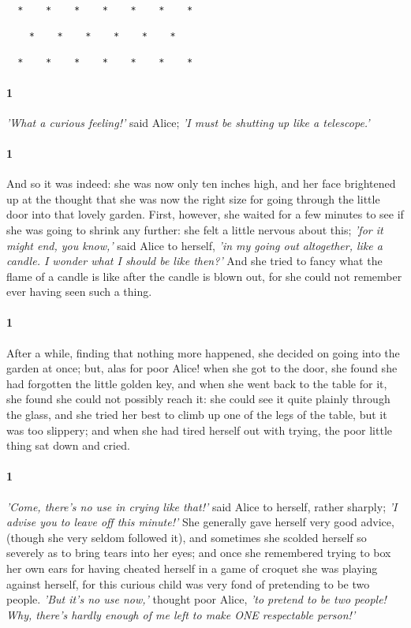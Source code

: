 \documentclass[12pt]{article}
\begin{document}
\begin{verbatim}

  *    *    *    *    *    *    *

    *    *    *    *    *    *

  *    *    *    *    *    *    *

\end{verbatim}

\paragraph{1} \textit{'What a curious feeling!'} said Alice; \textit{'I must be shutting up like a
    telescope.'}


\paragraph{1} And so it was indeed: she was now only ten inches high, and her face
brightened up at the thought that she was now the right size for going
through the little door into that lovely garden. First, however, she
waited for a few minutes to see if she was going to shrink any further:
she felt a little nervous about this; \textit{'for it might end, you know,'} said
Alice to herself, \textit{'in my going out altogether, like a candle. I wonder
what I should be like then?'} And she tried to fancy what the flame of a
candle is like after the candle is blown out, for she could not remember
ever having seen such a thing.


\paragraph{1} After a while, finding that nothing more happened, she decided on going
into the garden at once; but, alas for poor Alice! when she got to the
door, she found she had forgotten the little golden key, and when she
went back to the table for it, she found she could not possibly reach
it: she could see it quite plainly through the glass, and she tried her
best to climb up one of the legs of the table, but it was too slippery;
and when she had tired herself out with trying, the poor little thing
sat down and cried.


\paragraph{1} \textit{'Come, there's no use in crying like that!'} said Alice to herself,
rather sharply; \textit{'I advise you to leave off this minute!'} She generally
gave herself very good advice, (though she very seldom followed it),
and sometimes she scolded herself so severely as to bring tears into
her eyes; and once she remembered trying to box her own ears for having
cheated herself in a game of croquet she was playing against herself,
for this curious child was very fond of pretending to be two people.
\textit{'But it's no use now,'} thought poor Alice, \textit{'to pretend to be two people!
Why, there's hardly enough of me left to make ONE respectable person!'}
\end{document}
